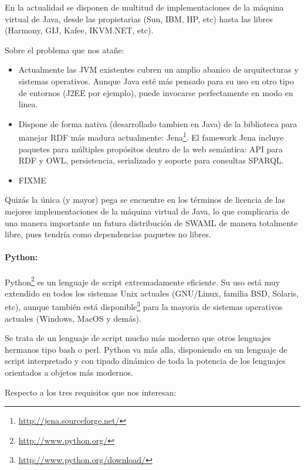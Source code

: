 En la actualidad se disponen de multitud de implementaciones de la máquina virtual
de Java, desde las propietarias (Sun, IBM, HP, etc) hasta las libres (Harmony, GIJ, 
Kafee, IKVM.NET, etc).

Sobre el problema que nos atañe:

\begin{itemize}
  \item Actualmente las JVM existentes cubren un amplio abanico de arquitecturas y 
	sistemas operativos. Aunque Java esté más pensado para su uso en otro tipo
	de entornos (J2EE por ejemplo), puede invocarse perfectamente en modo en
	linea.
  \item Dispone de forma nativa (desarrollado tambien en Java) de la biblioteca para
	manejar RDF más madura actualmente: Jena\footnote{\url{http://jena.sourceforge.net/}}.
	El famework Jena incluye paquetes para múltiples propósitos dentro de la web
	semántica: API para RDF y OWL, persistencia, serializado y soporte para consultas
	SPARQL.
  \item FIXME
\end{itemize}

Quizás la única (y mayor) pega se encuentre en los términos de licencia de las 
mejores implementaciones de la máquina virtual de Java, lo que complicaria de una
manera importante un futura distribución de SWAML de manera totalmente libre,
pues tendría como dependencias paquetes no libres.


\paragraph{Python:}Python\footnote{\url{http://www.python.org/}} es un lenguaje de 
script extremadamente eficiente. Su uso está muy extendido en todos los sistemas 
Unix actuales (GNU/Linux, familia BSD, Solaris, etc), aunque también está disponible\footnote{\url{http://www.python.org/download/}} para la mayoria de sistemas 
operativos actuales (Windows, MacOS y demás).

Se trata de un lenguaje de script mucho más moderno que otros lenguajes hermanos 
tipo bash o perl. Python va más alla, disponiendo en un lenguaje de script 
interpretado y con tipado dinámico de toda la potencia de los lenguajes orientados 
a objetos más modernos.

Respecto a los tres requisitos que nos interesan:

